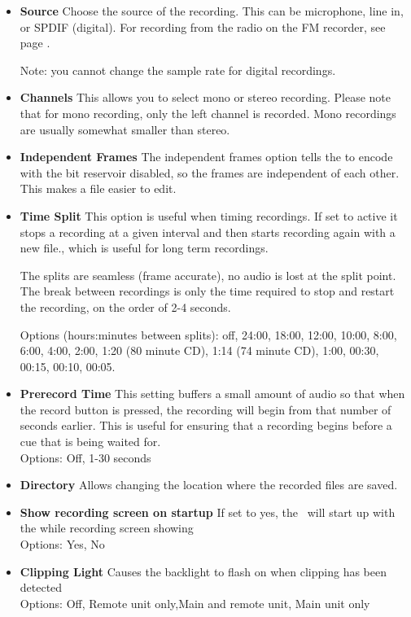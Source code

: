 {\begin{itemize}
  \item \textbf{Source}
    Choose the source of the recording.  This can be microphone, line in, or SPDIF (digital). For recording from the radio on the FM recorder, see page \pageref{ref:FMradio}.
    
    Note: you cannot change the sample rate for digital recordings.
    
  \item \textbf{Channels}
    This allows you to select mono or stereo recording.  Please note that for mono recording, only the left channel is recorded.  Mono recordings are usually somewhat smaller than stereo.
    
  \item \textbf{Independent Frames}
    The independent frames option tells the \dap to encode with the bit reservoir disabled, so the frames are independent of each other. This makes a file easier to edit.
    
  \item \textbf{Time Split}
    This option is useful when timing recordings. If set to active it stops a recording at a given interval and then starts recording again with a new file., which is useful for long term recordings.
    
    The splits are seamless (frame accurate), no audio is lost at the split point. The break between recordings is only the time required to stop and restart the recording, on the order of 2{}-4 seconds.
    
    Options (hours:minutes between splits): off, 24:00, 18:00, 12:00, 10:00, 8:00, 6:00, 4:00, 2:00, 1:20 (80 minute CD), 1:14 (74 minute  CD), 1:00, 00:30, 00:15, 00:10, 00:05.
    
  \item \textbf{Prerecord Time}
    This setting buffers a small amount of audio so that when the record button is pressed, the recording will begin from that number of seconds earlier. This is useful for ensuring that a recording begins before a cue that is being waited for.\\
    Options: Off, 1{}-30 seconds\\
    
  \item \textbf{Directory}
    Allows changing the location where the recorded files are saved.\\
    
  \item \textbf{Show recording screen on startup}	If set to yes, the \dap\ will start up with the while recording screen showing\\
    Options: Yes, No\\
    
  \item \textbf{Clipping Light} Causes the backlight to flash on when clipping has been detected\\
    Options: Off, Remote unit only,Main and remote unit, Main unit only\\
    
  \end{itemize}
}

